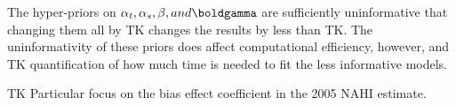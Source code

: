 The hyper-priors on $\alpha_t, \alpha_s, \beta, and \boldgamma$ are
sufficiently uninformative that changing them all by TK changes the
results by less than TK.  The uninformativity of these priors does
affect computational efficiency, however, and TK quantification of how
much time is needed to fit the less informative models.

TK Particular focus on the bias effect coefficient in the 2005 NAHI estimate.
